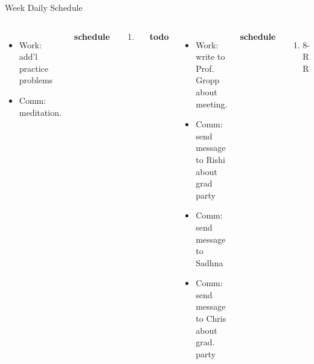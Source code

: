 \documentclass[serif, mathserif, final]{beamer}
\newcommand{\timeEst}[1]{\textit{Time:} \textit{#1}}
\newcommand{\priority}[1]{\textit{Priority:} \textit{#1}}
\newcommand{\deadline}[1]{#1}
\begin{document}
\begin{frame}{}
\begin{columns}
\begin{column}{0.50\linewidth}
\begin{block}{Week Daily Schedule}
\begin{columns}
\begin{itemize}
    \tiny \item \tiny Work: add'l practice problems 
    \tiny \item \tiny Comm: meditation. 
    
  \end{itemize}  
  \textbf{\small schedule}\\ 
  \begin{enumerate} 
    \tiny \item \tiny 
  \end{enumerate} 

  \textbf{\small todo} \\
  \begin{itemize} 
    \tiny \item \tiny Work: write to Prof. Gropp about meeting. 
    \item \tiny Comm: send message to Rishi about grad party 
    \item \tiny Comm: send message to Sadhna 
      \item \tiny Comm:  send message to Chris about grad. party 
  \end{itemize}  
  \textbf{\small schedule} \\  
  \begin{enumerate} 
    \tiny \item \tiny 8-9AM: Regular Routines 
  \end{enumerate}  

  \textbf{\small todo}\\
  \begin{itemize} 
    \tiny \item \tiny Work: finish  
  \end{itemize}
  \textbf{\small schedule}\\
  \begin{enumerate} 
    \tiny \item \tiny 8-9AM: Regular Routines 
  \end{enumerate} 

  \textbf{\small todo}\\ 
  \begin{itemize} 
    \tiny \item \tiny -  \deadline{ }   \timeEst{}  \priority{} 
  \end{itemize} 
  \textbf{\small schedule}\\
  \begin{enumerate} 
    \tiny \item \tiny 8-9AM: Regular Routines 
  \end{enumerate}
  

\end{columns}
\end{block}
\end{column}
\end{columns}
\end{frame}
\end{document}
